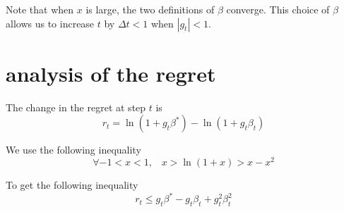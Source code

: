 \documentclass{article}
\newcommand{\dt}{\Delta t}
\begin{document}
Note that when $x$ is large, the two definitions of $\beta$ converge.
This choice of $\beta$ allows us to increase $t$ by $\dt < 1$ when $|g_t|<1$.


\section{analysis of the regret}

The change in the regret at step $t$ is 
\[
r_t = \ln (1+g_t\beta^*) - \ln (1+g_t \beta_t)
\]

We use the following inequality
\[
\forall -1 < x < 1, \;\;\; x > \ln (1+x) > x-x^2
\]

To get the following inequality
\[
r_t \leq g_t \beta^* - g_t \beta_t +g_t^2 \beta_t^2
\]
\end{document}
